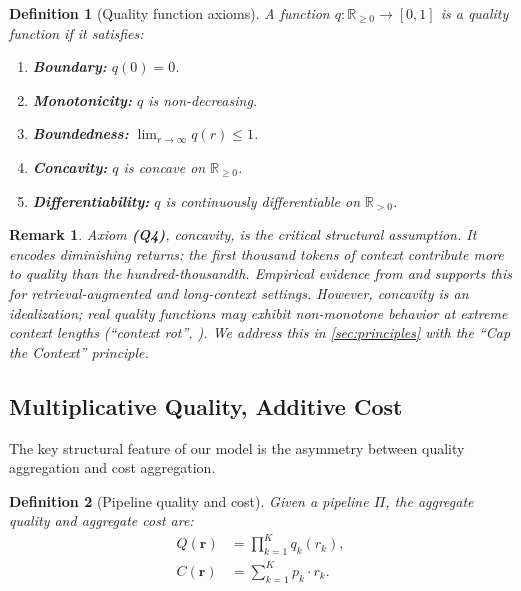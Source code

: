 \documentclass[11pt, a4paper, copyright]{googledeepmind}
\newtheorem{definition}{Definition}[section]
\newtheorem*{remark}{Remark}
\begin{document}
\begin{definition}[Quality function axioms]\label{def:quality-axioms}
A function $q: \mathbb{R}_{\geq 0} \to [0,1]$ is a \emph{quality function} if it satisfies:
\begin{enumerate}[label=\textbf{(Q\arabic*)}, nosep]
    \item \textbf{Boundary:} $q(0) = 0$.
    \item \textbf{Monotonicity:} $q$ is non-decreasing.
    \item \textbf{Boundedness:} $\lim_{r \to \infty} q(r) \leq 1$.
    \item \textbf{Concavity:} $q$ is concave on $\mathbb{R}_{\geq 0}$.
    \item \textbf{Differentiability:} $q$ is continuously differentiable on $\mathbb{R}_{> 0}$.
\end{enumerate}
\end{definition}

\begin{remark}
Axiom \textbf{(Q4)}, concavity, is the critical structural assumption. It encodes diminishing returns: the first thousand tokens of context contribute more to quality than the hundred-thousandth. Empirical evidence from \citet{gao2025context} and \citet{liu2024lost} supports this for retrieval-augmented and long-context settings. However, concavity is an idealization; real quality functions may exhibit non-monotone behavior at extreme context lengths (``context rot'', \citealp{chroma2025rot}). We address this in \cref{sec:principles} with the ``Cap the Context'' principle.
\end{remark}

\subsection{Multiplicative Quality, Additive Cost}

The key structural feature of our model is the asymmetry between quality aggregation and cost aggregation.

\begin{definition}[Pipeline quality and cost]\label{def:quality-cost}
Given a pipeline $\Pi$, the \emph{aggregate quality} and \emph{aggregate cost} are:
\begin{align}
    Q(\mathbf{r}) &= \prod_{k=1}^{K} q_k(r_k), \label{eq:mult-quality} \\
    C(\mathbf{r}) &= \sum_{k=1}^{K} p_k \cdot r_k. \label{eq:add-cost}
\end{align}
\end{definition}
\end{document}
